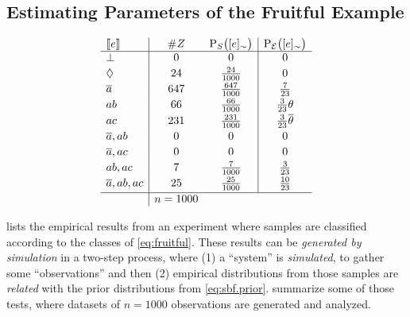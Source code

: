 \documentclass{article}
\begin{document}
\subsection{Estimating Parameters of the Fruitful Example}\label{subsec:sbf.example}

\begin{table}[t]
	\begin{center}
		\[
			\begin{array}{l|cc|c}
				\stablecore{e}
				 & \#Z
				 & \prd{S}\at{\class{e}}
				 & \prE\at{\class{e}}
				\\
				\hline
				\inconsistent
				 & 0
				 & 0
				 & 0                       \\[2pt]
				\indepclass
				 & 24
				 & \frac{24}{1000}
				 & 0                       \\[2pt]
				\co{a}
				 & 647
				 & \frac{647}{1000}
				 & \frac{7}{23}
				\\[2pt]
				ab
				 & 66
				 & \frac{66}{1000}
				 & \frac{3}{23}\theta      \\[2pt]
				ac
				 & 231
				 & \frac{231}{1000}
				 & \frac{3}{23}\co{\theta}
				\\[2pt]
				\co{a}, ab
				 & 0
				 & 0
				 & 0                       \\[2pt]
				\co{a}, ac
				 & 0
				 & 0
				 & 0
				\\[2pt]
				ab, ac
				 & 7
				 & \frac{7}{1000}
				 & \frac{3}{23}
				\\[2pt]
				\co{a}, ab, ac
				 & 25
				 & \frac{25}{1000}
				 & \frac{10}{23}
				\\[2pt]
				\hline
				 & n = 1000\end{array}
		\]
	\end{center}

	\caption{\emph{Experiment 1: Bias to \(ac\).} Results from an
		experiment where \(n=1000\) samples where generated following
		the \emph{Model+Noise} procedure with parameters
		\(\alpha = 0.1, \beta = 0.3, \gamma = 0.2\).
		Column \(\#Z\) lists the number of observations on each class,
		the \emph{empirical} distribution is represented by \(\prd{S}\)
		and the \emph{prior}, as before, is denoted by \(\prE\).}
	\label{tab:sbf.example}
\end{table}

 lists the empirical results from an experiment
where samples are classified according to
the classes of \cref{eq:fruitful}.
These results can be \emph{generated by simulation} in a two-step
process, where (1) a ``system'' is \emph{simulated}, to gather some
``observations'' and then (2) empirical distributions from those
samples are \emph{related} with the prior distributions from
\cref{eq:sbf.prior}.  
summarize some of those tests, where datasets of \(n = 1000\)
observations are generated and analyzed.
\end{document}
